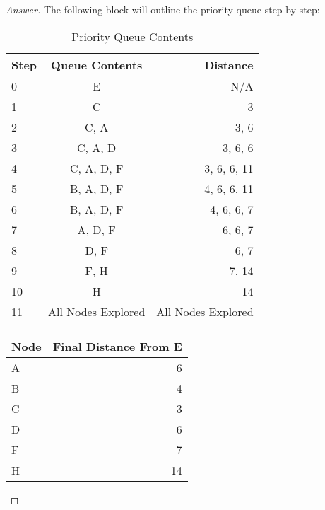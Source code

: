 \documentclass[11pt]{article}
\theoremstyle{definition}
\theoremstyle{definition}
\theoremstyle{definition}
\begin{document}
\begin{proof}[Answer]
\indent The following block will outline the priority queue step-by-step:
\begin{table}[h!]
	\begin{center}
		\caption{Priority Queue Contents}
		\label{tab:table1}
		\begin{tabular}{l|c|r} %
			\textbf{Step} & \textbf{Queue Contents} & \textbf{Distance}\\
			\hline
			0 & E & N/A\\
			1 & C & 3\\
			2 & C, A & 3, 6\\
			3 & C, A, D & 3, 6, 6\\
			4 & C, A, D, F & 3, 6, 6, 11\\
			5 & B, A, D, F & 4, 6, 6, 11\\
			6 & B, A, D, F & 4, 6, 6, 7\\
			7 & A, D, F & 6, 6, 7\\
			8 & D, F & 6, 7\\
			9 & F, H & 7, 14\\
			10 & H & 14\\
			11 & All Nodes Explored & All Nodes Explored\\
		\end{tabular}
	\end{center}
\end{table}

\begin{table}[h!]
	\begin{center}
		\label{tab:table1}
		\begin{tabular}{l|r} %
			\textbf{Node} & \textbf{Final Distance From E}\\
			\hline
			A & 6 \\
			B & 4 \\
			C & 3 \\
			D & 6 \\
			F & 7 \\
			H & 14 \\
		\end{tabular}
	\end{center}
\end{table}
\end{proof}

\newpage
\end{document}
